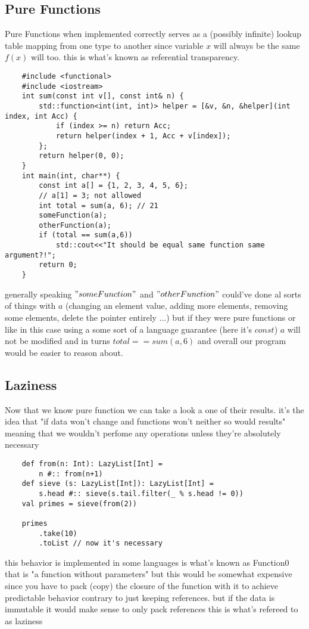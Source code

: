 \documentclass[conference]{IEEEtran}
\begin{document}
\subsection{Pure Functions}
Pure Functions when implemented correctly serves as a (possibly infinite) lookup table mapping from one type to another since variable $x$ will always be the same $f(x)$ will too. this is what's known as referential transparency.
\lstset{style=cpp}
\begin{lstlisting}
    #include <functional>
    #include <iostream>
    int sum(const int v[], const int& n) {
        std::function<int(int, int)> helper = [&v, &n, &helper](int index, int Acc) {
            if (index >= n) return Acc;
            return helper(index + 1, Acc + v[index]);
        };
        return helper(0, 0);
    }
    int main(int, char**) {
        const int a[] = {1, 2, 3, 4, 5, 6};
        // a[1] = 3; not allowed
        int total = sum(a, 6); // 21
        someFunction(a);
        otherFunction(a);
        if (total == sum(a,6))
            std::cout<<"It should be equal same function same argument?!";
        return 0;
    }
\end{lstlisting}
generally speaking $"someFunction"$ and $"otherFunction"$ could've done al sorts of things with $a$ (changing an element value, adding more elements, removing some elements, delete the pointer entirely ...) but if they were pure functions or like in this case using a some sort of a language guarantee (here it's $const$) $a$ will not be modified and in turns $total == sum(a,6)$ and overall our program would be easier to reason about.

\subsection{Laziness}
Now that we know pure function we can take a look a one of their results. it's the idea that "if data won't change and functions won't neither so would results" meaning that we wouldn't perfome any operations unless they're absolutely necessary 
\lstset{style=scala}
\begin{lstlisting}
    def from(n: Int): LazyList[Int] = 
        n #:: from(n+1)
    def sieve (s: LazyList[Int]): LazyList[Int] = 
        s.head #:: sieve(s.tail.filter(_ % s.head != 0))
    val primes = sieve(from(2))

    primes
        .take(10)
        .toList // now it's necessary

\end{lstlisting}
this behavior is implemented in some languages is what's known as Function0 that is "a function without parameters" but this would be somewhat expensive since you have to pack (copy) the closure of the function with it to achieve predictable behavior contrary to just keeping references. but if the data is immutable it would make sense to only pack references this is what's refereed to as laziness 
\end{document}
